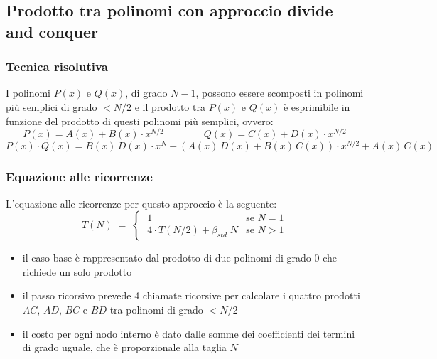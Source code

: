 \subsection{Prodotto tra polinomi con approccio divide and conquer}
\subsubsection*{Tecnica risolutiva}
I polinomi \(P(x)\) e \(Q(x)\), di grado \(N-1\), possono essere scomposti in polinomi più semplici di grado \(< N/2\)
e il prodotto tra \(P(x)\) e \(Q(x)\) è esprimibile in funzione del prodotto di questi polinomi più semplici, ovvero:
\[P(x) = A(x) + B(x) \cdot x^{N/2} \qquad\qquad Q(x) = C(x) + D(x) \cdot x^{N/2}\]
\[P(x) \cdot Q(x) = B(x) \, D(x) \cdot x^N + (A(x) \, D(x) + B(x) \, C(x)) \cdot x^{N/2} + A(x) \, C(x)\]

\subsubsection*{Equazione alle ricorrenze}
L'equazione alle ricorrenze per questo approccio è la seguente:
\[T(N) \; = \; \begin{cases}
	\; 1 & \text{se } N = 1 \\[3pt]
	\; 4 \cdot T(N/2) + \beta_{std} \; N & \text{se } N > 1
\end{cases}\]
\begin{itemize}
	\item il caso base è rappresentato dal prodotto di due polinomi di grado 0 che richiede un solo prodotto
	\item il passo ricorsivo prevede 4 chiamate ricorsive per calcolare i quattro prodotti \(AC\), \(AD\), \(BC\) e \(BD\)
	tra polinomi di grado \(< N/2\)
	\item il costo per ogni nodo interno è dato dalle somme dei coefficienti dei termini di grado uguale, che è proporzionale
	alla taglia \(N\)
\end{itemize}

